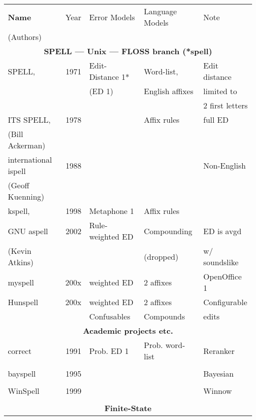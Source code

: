 \documentclass[officiallayout]{unihelcompling}
\begin{document}
\begin{table}
    \centering
    \begin{tiny}
    \begin{tabular}{|l|r|l|l|l|}
        \hline
        \bf Name & Year & Error Models & Language Models & Note \\
(Authors) & & & & \\
        \hline
        \multicolumn{5}{|c|}{\bf SPELL --- Unix --- FLOSS branch (*spell) }\\
        \hline
             SPELL, & 1971 & Edit-Distance 1* & Word-list, & Edit distance \\
        \citep{gorin1971spell} &  & (ED 1) & English affixes & limited to \\
                                  &  & &              & 2 first letters \\
        ITS SPELL, & 1978 &  & Affix rules & full ED \\
     (Bill Ackerman) & & & & \\
        international ispell & 1988 & & & Non-English \\
              (Geoff Kuenning) & & & & \\
        \hline
        kspell, & 1998 & Metaphone 1 & Affix rules & \\
        GNU aspell & 2002 & Rule-weighted ED & Compounding & ED is avgd \\
    (Kevin Atkins) & & & (dropped) & w/ soundslike \\
        \hline
        myspell & 200x & weighted ED & 2 affixes & OpenOffice 1 \\
        \hline
        Hunspell & 200x & weighted ED & 2 affixes & Configurable \\
                 &      & Confusables & Compounds & edits \\
        \hline
        \multicolumn{5}{|c|}{\bf Academic projects etc.} \\
        \hline
        correct & 1991 & Prob. ED 1 & Prob. word-list & Reranker \\
        \citep{church1991probability} & & & & \\
        \hline
        bayspell  & 1995 & & & Bayesian \\
        \citep{golding1995bayesian} \\
        \hline
        WinSpell & 1999 & & & Winnow \\
        \citep{golding1999winnow} & \\
        \hline
        \multicolumn{5}{|c|}{\bf Finite-State} \\

\end{tabular}
\end{tiny}
\end{table}
\end{document}
